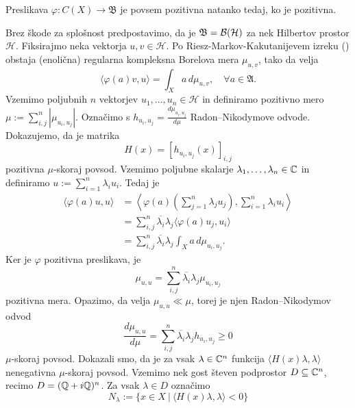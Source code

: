 \begin{trditev}\label{trd:1.2}
    Preslikava $\varphi: C(X) \to \mathfrak{B}$ je povsem pozitivna natanko tedaj, ko je pozitivna. 
\end{trditev}

\begin{dokaz}
    Brez škode za splošnost predpostavimo, da je $\mathfrak{B} = \operatorname{\mathcal{B} (\mathcal{H})}$ za nek Hilbertov prostor $\mathcal{H}$.
            Fiksirajmo neka vektorja $u, v\in \mathcal{H}$. Po Riesz-Markov-Kakutanijevem izreku (\cite[Theorem 6.18, str. 129]{rudin1987}) obstaja (enolična) 
            regularna kompleksna Borelova mera $\mu_{u, v}$,
            tako da velja
            $$\langle \varphi(a) v, u \rangle = \int_X a \, d\mu_{u, v},\quad \forall a \in \mathfrak{A}.$$
            Vzemimo poljubnih $n$ vektorjev $u_1, \dots, u_n \in \mathcal{H}$ in definiramo pozitivno mero
            $\mu := \sum_{i, j} ^n |\mu_{u_i, u_j}|$. Označimo s
            $h_{u_i, u_j} = \frac{d \mu_{u_i, u_j}}{d \mu}$ Radon--Nikodymove odvode. 
            Dokazujemo, da je matrika $$H(x) = [h_{u_i, u_j} (x)]_{i, j}$$
            pozitivna $\mu$-skoraj povsod.    
            Vzemimo poljubne skalarje $\lambda_1, \dots, \lambda_n \in \mathbb C$ in definiramo $u := \sum_{i = 1} ^n \lambda_i u_i$.
            Tedaj je
            \begin{align*}
                \langle \varphi (a) u, u \rangle &= \left\langle \varphi (a) \left( \sum_{j = 1} ^n \lambda_j u_j \right), \sum_{i = 1} ^n \lambda_i u_i \right\rangle\\
                &= \sum_{i, j} ^n \overline{\lambda_i} \lambda_j \langle \varphi (a) u_j, u_i \rangle\\
                &= \sum_{i, j} ^n \overline{\lambda_i} \lambda_j \int_X a\, d\mu_{u_i, u_j}.
            \end{align*}
            Ker je $\varphi$ pozitivna preslikava, je
            $$\mu_{u, u} = \sum_{i, j} ^n \overline{\lambda_i} \lambda_j \mu_{u_i, u_j}$$
            pozitivna mera.
            Opazimo, da velja $\mu_{u, u} \ll \mu$, torej je njen Radon--Nikodymov odvod
            $$\frac{ d\mu_{u, u}}{d \mu} = \sum_{i, j} ^n \overline{\lambda_i} \lambda_j h_{u_i, u_j} \geq 0$$
            $\mu$-skoraj povsod.
            Dokazali smo, da je za vsak $\lambda \in \mathbb C^n$ funkcija $\langle H(x) \lambda, \lambda \rangle$ nenegativna $\mu$-skoraj povsod.
            Vzemimo nek gost števen podprostor $D \subseteq \mathbb C^n$, recimo $D = (\mathbb Q + i \mathbb Q)^n$.
            Za vsak $\lambda \in D$ označimo $$N_{\lambda} := \{x \in X\ |\ \langle H(x) \lambda, \lambda \rangle < 0\}$$

\end{dokaz}
